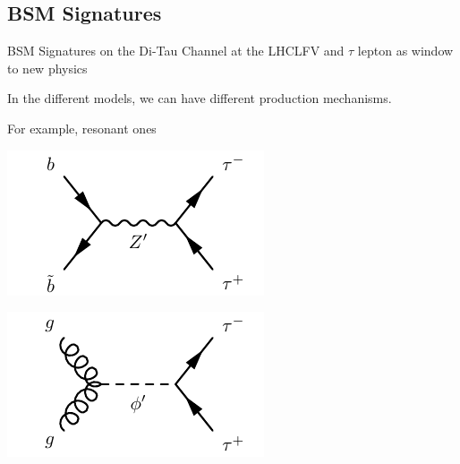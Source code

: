 \documentclass{../bredelebeamer}
\begin{document}
\subsection{BSM Signatures}
\begin{frame}{BSM Signatures on the Di-Tau Channel at the LHC}{LFV and $\tau$ lepton as window to new physics}
	
	In the different models, we can have different production mechanisms. 
	
	For example, resonant ones

	\begin{minipage}{.45\linewidth}
		\begin{center}
			\includegraphics[width=.9\linewidth]{DY.pdf}
		\end{center}
	\end{minipage}
	\hfill
	\begin{minipage}{.45\linewidth}
		\begin{center}
			\includegraphics[width=.9\linewidth]{DY_scalar.pdf}
		\end{center}
	\end{minipage}
	

\end{frame}
\end{document}
